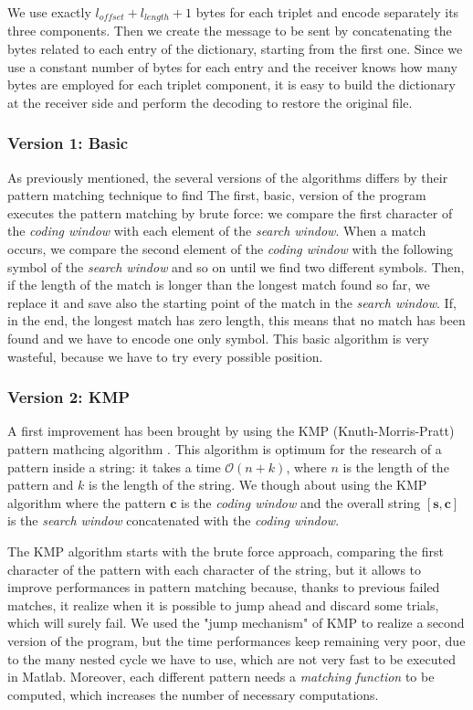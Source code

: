 We use exactly $l_{offset} + l_{length} + 1$ bytes for each triplet and encode separately its three components. Then we create the message to be sent by concatenating the bytes related to each entry of the dictionary, starting from the first one. Since we use a constant number of bytes for each entry and the receiver knows how many bytes are employed for each triplet component, it is easy to build the dictionary at the receiver side and perform the decoding to restore the original file.

\subsubsection{Version 1: Basic}
As previously mentioned, the several versions of the algorithms differs by their pattern matching technique to find The first, basic, version of the program executes the pattern matching by brute force: we compare the first character of the \textit{coding window} with each element of the \textit{search window}. When a match occurs, we compare the second element of the \textit{coding window} with the following symbol of the \textit{search window} and so on until we find two different symbols. Then, if the length of the match is longer than the longest match found so far, we replace it and save also the starting point of the match in the \textit{search window}. If, in the end, the longest match has zero length, this means that no match has been found and we have to encode one only symbol. This basic algorithm is very wasteful, because we have to try every possible position.

\subsubsection{Version 2: KMP}
A first improvement has been brought by using the KMP (Knuth-Morris-Pratt) pattern mathcing algorithm \cite{knuth1}. This algorithm is optimum for the research of a pattern inside a string: it takes a time $\mathcal{O}(n + k)$, where $n$ is the length of the pattern and $k$ is the length of the string. We though about using the KMP algorithm where the pattern $\mathbf{c}$ is the \textit{coding window} and the overall string $[\mathbf{s}, \mathbf{c}]$ is the \textit{search window} concatenated with the \textit{coding window}.

The KMP algorithm starts with the brute force approach, comparing the first character of the pattern with each character of the string, but it allows to improve performances in pattern matching because, thanks to previous failed matches, it realize when it is possible to jump ahead and discard some trials, which will surely fail. We used the "jump mechanism" of KMP to realize a second version of the program, but the time performances keep remaining very poor, due to the many nested cycle we have to use, which are not very fast to be executed in Matlab. Moreover, each different pattern needs a \textit{matching function} to be computed, which increases the number of necessary computations.

